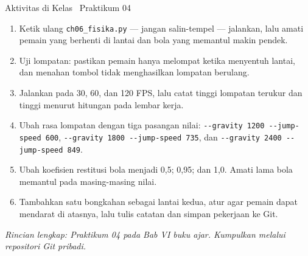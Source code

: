 \documentclass[aspectratio=169,10pt]{beamer}
\begin{document}
\begin{frame}{Aktivitas di Kelas \textperiodcentered\ Praktikum 04}
\begin{enumerate}
  \item Ketik ulang \texttt{ch06\_fisika.py} --- jangan salin-tempel ---
        jalankan, lalu amati pemain yang berhenti di lantai dan bola yang
        memantul makin pendek.
  \item Uji lompatan: pastikan pemain hanya melompat ketika menyentuh lantai,
        dan menahan tombol tidak menghasilkan lompatan berulang.
  \item Jalankan pada 30, 60, dan 120 FPS, lalu catat tinggi lompatan terukur
        dan tinggi menurut hitungan pada lembar kerja.
  \item Ubah rasa lompatan dengan tiga pasangan nilai:
        \texttt{-{}-gravity 1200 -{}-jump-speed 600},
        \texttt{-{}-gravity 1800 -{}-jump-speed 735}, dan
        \texttt{-{}-gravity 2400 -{}-jump-speed 849}.
  \item Ubah koefisien restitusi bola menjadi 0,5; 0,95; dan 1,0. Amati lama
        bola memantul pada masing-masing nilai.
  \item Tambahkan satu bongkahan sebagai lantai kedua, atur agar pemain dapat
        mendarat di atasnya, lalu tulis catatan dan simpan pekerjaan ke Git.
\end{enumerate}
\vspace{0.12cm}
{\footnotesize\color{ubAccent}\itshape Rincian lengkap: Praktikum 04 pada Bab VI
buku ajar. Kumpulkan melalui repositori Git pribadi.}
\end{frame}
\end{document}
